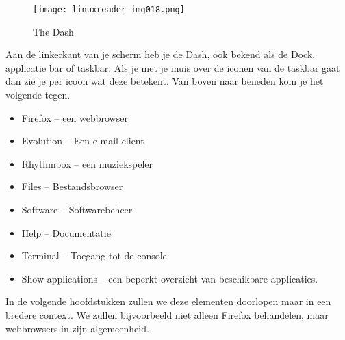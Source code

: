 \begin{wrapfigure}{l}{0.2\textwidth}
	\begin{center}
	\texttt{[image: linuxreader-img018.png]}
	\end{center}
	\caption{The Dash}
	\label{fig:de_dash}
\end{wrapfigure}

Aan de linkerkant van je scherm heb je de Dash, ook bekend als de Dock, applicatie bar of taskbar. Als je met je muis over de iconen van de taskbar gaat dan zie je per icoon wat deze betekent. Van boven naar beneden kom je het volgende tegen.

\begin{itemize}
\item Firefox -- een webbrowser
\item Evolution -- Een e-mail client
\item Rhythmbox -- een muziekspeler
\item Files -- Bestandsbrowser
\item Software -- Softwarebeheer
\item Help -- Documentatie
\item Terminal -- Toegang tot de console
\item Show applications -- een beperkt overzicht van beschikbare applicaties.
\end{itemize}

In de volgende hoofdstukken zullen we deze elementen doorlopen maar in een bredere context. We zullen bijvoorbeeld niet alleen Firefox behandelen, maar webbrowsers in zijn algemeenheid.

